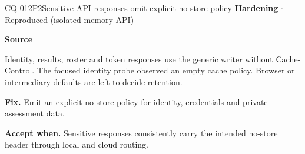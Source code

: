 \begin{finding}{CQ-012}{P2}{Sensitive API responses omit explicit no-store policy}
\textbf{Hardening} $\cdot$ Reproduced (isolated memory API)\par
\textbf{Source}\quad{}\par
Identity, results, roster and token responses use the generic writer without Cache-Control. The focused identity probe observed an empty cache policy. Browser or intermediary defaults are left to decide retention.\par
\textbf{Fix.} Emit an explicit no-store policy for identity, credentials and private assessment data.\par
\textbf{Accept when.} Sensitive responses consistently carry the intended no-store header through local and cloud routing.
\end{finding}
\clearpage
